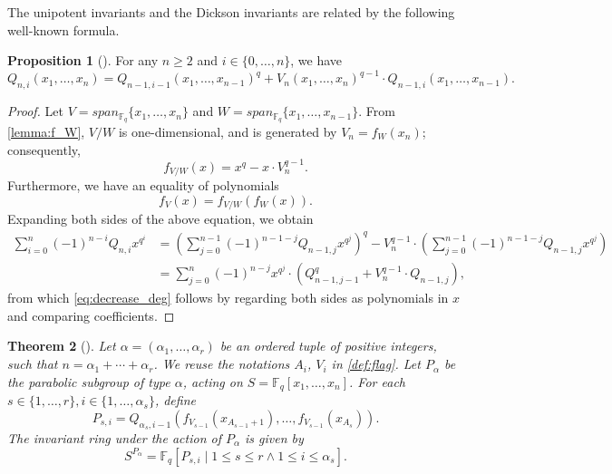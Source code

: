 \documentclass[12pt,a4paper]{report}
\newtheorem{theorem}{Theorem}[chapter]
\theoremstyle{definition}
\newtheorem{proposition}[theorem]{Proposition}
\theoremstyle{remark}
\theoremstyle{definition}
\begin{document}
The unipotent invariants and the Dickson invariants are related by the following well-known formula.
\begin{proposition}[{\cite[Proposition 1.3]{wilkerson}}]\label{prop:decrease_deg}
    For any $n\geq 2$ and $i\in \{0, \ldots, n\}$, we have
    \begin{equation}\label{eq:decrease_deg}
        Q_{n, i}(x_1, \ldots, x_n) = Q_{n-1, i-1}(x_1, \ldots, x_{n-1})^{q} + V_n(x_1, \ldots, x_n)^{q-1} \cdot Q_{n-1, i}(x_1, \ldots, x_{n-1}).
    \end{equation}
\end{proposition}
\begin{proof}
    Let $V = span_{\mathbb{F}_q}\{x_1, \ldots, x_n\}$ and $W = span_{\mathbb{F}_q}\{x_1, \ldots, x_{n-1}\}$. From \cref{lemma:f_W}, $V/W$ is one-dimensional, and is generated by $V_n = f_W(x_n)$; consequently,
    \begin{equation*}
        f_{V/W}(x) = x^q - x\cdot V_n^{q-1}.
    \end{equation*}
    Furthermore, we have an equality of polynomials
    \begin{equation*}
        f_V(x)= f_{V/W}(f_W(x)).
    \end{equation*}
    Expanding both sides of the above equation, we obtain
    \begin{align*}
        \sum\limits_{i=0}^{n}(-1)^{n-i}Q_{n, i}x^{q^{i}} &= \left(\sum\limits_{j=0}^{n-1}(-1)^{n-1-j}Q_{n-1, j}x^{q^{j}}\right)^q - V_n^{q-1}\cdot \left(\sum\limits_{j=0}^{n-1}(-1)^{n-1-j}Q_{n-1, j}x^{q^{j}}\right)\\
        &= \sum\limits_{j=0}^{n}(-1)^{n-j}x^{q^{j}}\cdot (Q_{n-1, j-1}^{q} + V_n^{q-1}\cdot Q_{n-1, j}),
    \end{align*}
    from which \eqref{eq:decrease_deg} follows by regarding both sides as polynomials in $x$ and comparing coefficients.
\end{proof}
\begin{theorem}[{\cite[Theorem 2.6]{hewett_modular_1996}}]
    Let $\alpha = (\alpha_1, \ldots, \alpha_r)$ be an ordered tuple of positive integers, such that $n = \alpha_1 + \cdots + \alpha_r$. We reuse the notations $A_i$, $V_i$ in \cref{def:flag}. Let $P_{\alpha}$ be the parabolic subgroup of type $\alpha$, acting on $S = \mathbb{F}_q[x_1, \ldots, x_n]$. For each $s\in \{1, \ldots, r\}, i\in \{1, \ldots, \alpha_s\}$, define
    \begin{equation*}
        P_{s, i}=Q_{\alpha_s, i-1}(f_{V_{s-1}}(x_{A_{s-1}+1}), \ldots, f_{V_{s-1}}(x_{A_{s}})).
    \end{equation*}
    The invariant ring under the action of $P_{\alpha}$ is given by
    \begin{equation*}
        S^{P_{\alpha}} = \mathbb{F}_q[P_{s, i}\mid 1\leq s\leq r \land 1\leq i\leq \alpha_s].
    \end{equation*}
\end{theorem}
\end{document}
